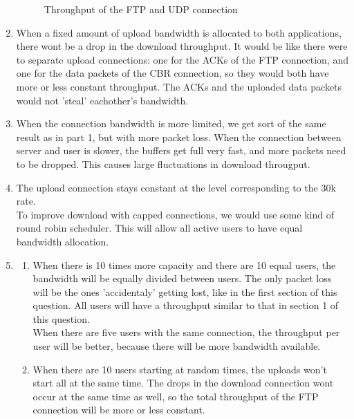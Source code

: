 \documentclass[a4paper,12pt,titlepage]{report}
\begin{document}
\begin{enumerate}
\begin{figure}[htb]
\caption{Throughput of the FTP and UDP connection}
\label{upAndDown}
\end{figure}
\item When a fixed amount of upload bandwidth is allocated to both applications, there wont be a drop in the download throughput. It would be like there were to separate upload connections: one for the ACKs of the FTP connection, and one for the data packets of the CBR connection, so they would both have more or less constant throughput. The ACKs and the uploaded data packets would not 'steal' eachother's bandwidth. 
\item When the connection bandwidth is more limited, we get sort of the same result as in part 1, but with more packet loss. When the connection between server and user is slower, the buffers get full very fast, and more packets need to be dropped. This causes large fluctuations in download througput. \\
\item The upload connection stays constant at the level corresponding to the 30k rate. \\
To improve download with capped connections, we would use some kind of round robin scheduler. This will allow all active users to have equal bandwidth allocation. 
\item 
\begin{enumerate}
  \item When there is 10 times more capacity and there are 10 equal users, the bandwidth will be equally divided between users. The only packet loss will be the ones 'accidentaly' getting lost, like in the first section of this question. All users will have a throughput similar to that in section 1 of this question. \\
  When there are five users with the same connection, the throughput per user will be better, because there will be more bandwidth available.
  \item When there are 10 users starting at random times, the uploads won't start all at the same time. The drops in the download connection wont occur at the same time as well, so the total throughput of the FTP connection will be more or less constant.
\end{enumerate}

\end{enumerate}
\end{document}
